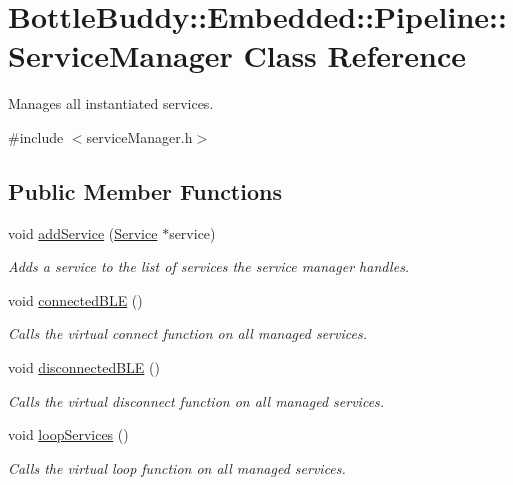 \hypertarget{class_bottle_buddy_1_1_embedded_1_1_pipeline_1_1_service_manager}{}\section{Bottle\+Buddy\+:\+:Embedded\+:\+:Pipeline\+:\+:Service\+Manager Class Reference}
\label{class_bottle_buddy_1_1_embedded_1_1_pipeline_1_1_service_manager}


Manages all instantiated services.  




{\ttfamily \#include $<$service\+Manager.\+h$>$}

\subsection*{Public Member Functions}
\begin{DoxyCompactItemize}
\item 
void \hyperlink{class_bottle_buddy_1_1_embedded_1_1_pipeline_1_1_service_manager_afcad5a2c7fd9461b746f1bf82a3c0ca3}{add\+Service} (\hyperlink{class_bottle_buddy_1_1_embedded_1_1_pipeline_1_1_service}{Service} $\ast$service)
\begin{DoxyCompactList}\small\item\em Adds a service to the list of services the service manager handles. \end{DoxyCompactList}\item 
void \hyperlink{class_bottle_buddy_1_1_embedded_1_1_pipeline_1_1_service_manager_a10d2ecdfbadf420302f3980cfd3e2d8c}{connected\+B\+LE} ()
\begin{DoxyCompactList}\small\item\em Calls the virtual connect function on all managed services. \end{DoxyCompactList}\item 
void \hyperlink{class_bottle_buddy_1_1_embedded_1_1_pipeline_1_1_service_manager_aacdfd5bc340d8cb07146a067e8914215}{disconnected\+B\+LE} ()
\begin{DoxyCompactList}\small\item\em Calls the virtual disconnect function on all managed services. \end{DoxyCompactList}\item 
void \hyperlink{class_bottle_buddy_1_1_embedded_1_1_pipeline_1_1_service_manager_a3c701a58eaba061104576c0cfc25f3fb}{loop\+Services} ()
\begin{DoxyCompactList}\small\item\em Calls the virtual loop function on all managed services. \end{DoxyCompactList}\end{DoxyCompactItemize}


